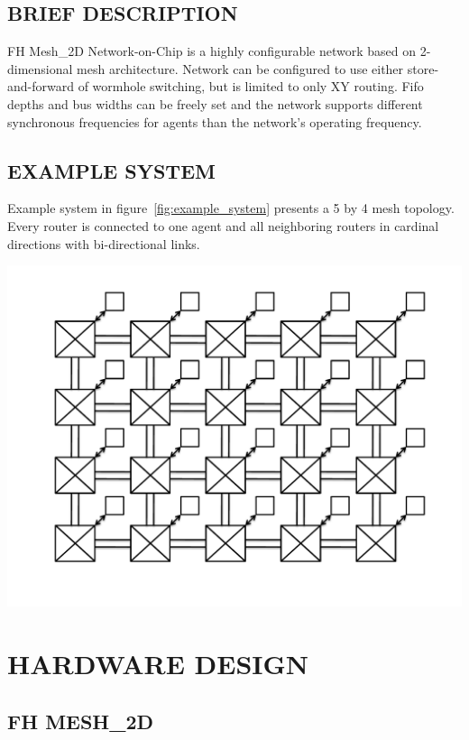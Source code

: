 \documentclass[a4paper,10pt,oneside,final]{article}
\begin{document}
\subsection{BRIEF DESCRIPTION}

FH Mesh\_2D Network-on-Chip is a highly configurable network based on
2-dimensional mesh architecture. Network can be configured to use
either store-and-forward of wormhole switching, but is limited to only
XY routing. Fifo depths and bus widths can be freely set and the
network supports different synchronous frequencies for agents than the
network's operating frequency.

\subsection{EXAMPLE SYSTEM}

Example system in figure~\ref{fig:example_system} presents a 5 by 4
mesh topology. Every router is connected to one agent and all
neighboring routers in cardinal directions with bi-directional links.

\begin{center}  
  \includegraphics[width=1.0\textwidth]{pic/mesh_5x4.pdf}
  \label{fig:example_system}
\end{center}



\newpage
\section{HARDWARE DESIGN}

\subsection{FH MESH\_2D}
\end{document}
